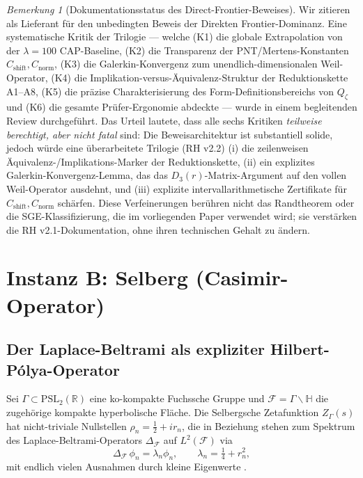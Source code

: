 \documentclass[11pt]{article}
\theoremstyle{definition}
\theoremstyle{remark}
\newtheorem{remark}[theorem]{Bemerkung}
\newcommand{\PSL}{\mathrm{PSL}}
\newcommand{\halfline}{\tfrac{1}{2}}
\begin{document}
\begin{remark}[Dokumentationsstatus des Direct-Frontier-Beweises]
\label{rem:riemann-critique-review}
Wir zitieren \cite{Geiger2026RHII} als Lieferant für den unbedingten Beweis
der Direkten Frontier-Dominanz. Eine systematische Kritik der Trilogie
\cite{Geiger2026RHII,Geiger2026RHIII} --- welche (K1) die globale Extrapolation von
der $\lambda = 100$ CAP-Baseline, (K2) die Transparenz der PNT/Mertens-Konstanten
$C_{\mathrm{shift}}, C_{\mathrm{norm}}$, (K3) die Galerkin-Konvergenz
zum unendlich-dimensionalen Weil-Operator, (K4) die Implikation-versus-Äquivalenz-Struktur
der Reduktionskette A1--A8, (K5) die präzise Charakterisierung des Form-Definitionsbereichs
von $Q_\zeta$ und (K6) die gesamte Prüfer-Ergonomie abdeckte --- wurde in einem
begleitenden Review \cite{RHCritiqueReview2026} durchgeführt.
Das Urteil lautete, dass alle sechs Kritiken \emph{teilweise berechtigt, aber nicht fatal}
sind: Die Beweisarchitektur ist substantiell solide, jedoch würde eine überarbeitete Trilogie
(RH v2.2) (i) die zeilenweisen Äquivalenz-/Implikations-Marker der Reduktionskette,
(ii) ein explizites Galerkin-Konvergenz-Lemma, das das $D_3(r)$-Matrix-Argument auf den
vollen Weil-Operator ausdehnt, und (iii) explizite intervallarithmetische Zertifikate
für $C_{\mathrm{shift}}, C_{\mathrm{norm}}$ schärfen. Diese Verfeinerungen berühren nicht
das Randtheorem oder die SGE-Klassifizierung, die im vorliegenden Paper verwendet wird; sie
verstärken die RH v2.1-Dokumentation, ohne ihren technischen Gehalt zu ändern.
\end{remark}

\section{Instanz B: Selberg (Casimir-Operator)}
\label{sec:selberg}

\subsection{Der Laplace-Beltrami als expliziter Hilbert-P\'olya-Operator}

Sei $\Gamma \subset \PSL_2(\mathbb{R})$ eine ko-kompakte Fuchssche Gruppe
und $\mathcal{F} = \Gamma\backslash\mathbb{H}$ die zugehörige kompakte
hyperbolische Fläche. Die Selbergsche Zetafunktion $Z_\Gamma(s)$ hat
nicht-triviale Nullstellen $\rho_n = \halfline + ir_n$, die in Beziehung stehen
zum Spektrum des Laplace-Beltrami-Operators $\Delta_\mathcal{F}$ auf
$L^2(\mathcal{F})$ via
\begin{equation}
\label{eq:selberg-spectral}
  \Delta_\mathcal{F}\,\phi_n = \lambda_n\phi_n, \qquad
  \lambda_n = \tfrac{1}{4} + r_n^2,
\end{equation}
mit endlich vielen Ausnahmen durch kleine Eigenwerte \cite{Selberg1956}.
\end{document}
